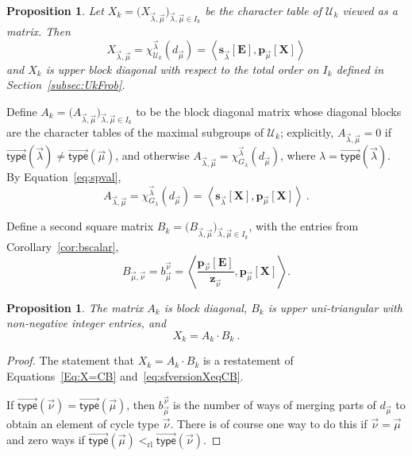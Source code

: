 \documentclass[10pt]{amsart}
\newtheorem{prop}[theorem]{Proposition}
\theoremstyle{definition}
\theoremstyle{remark}
\newcommand{\vtype}{\overrightarrow{\mathsf{type}}}
\newcommand{\XXX}{\mathbf{X}}
\newcommand{\EEE}{\mathbf{E}}
\begin{document}
\begin{prop} \label{prop:matrixX}
Let $X_k = \big( X_{ \vec{\lambda}, \vec{\mu}} \big)_{\vec{\lambda}, \vec{\mu}\in I_k}$
be the character table of $\mathcal{U}_k$ viewed as a matrix. Then
\[
X_{ \vec{\lambda}, \vec{\mu}} =
\chi^{\vec{\lambda}}_{\mathcal{U}_k}(d_{\vec{\mu}})
= \left< \mathbf{s}_{\vec{\lambda}}[\EEE], \mathbf{p}_{\vec{\mu}}[\XXX] \right>
\]
and $X_k$ is upper block diagonal with respect to the total order on $I_k$
defined in Section~\ref{subsec:UkFrob}.
\end{prop}

Define $A_k= \big( A_{ \vec{\lambda}, \vec{\mu}} \big)_{\vec{\lambda}, \vec{\mu}\in I_k}$
to be the block diagonal matrix whose diagonal blocks are the character
tables of the maximal subgroups of $\mathcal{U}_k$;
explicitly,
$A_{\vec{\lambda}, \vec{\mu}} = 0$ if $\vtype(\vec{\lambda}) \neq \vtype(\vec{\mu})$,
and otherwise
$A_{\vec{\lambda}, \vec{\mu}} = \chi^{\vec{\lambda}}_{G_\lambda}(d_{\vec{\mu}})$,
where $\lambda = \vtype(\vec{\lambda})$.
By Equation~\eqref{eq:spval},
\[
A_{\vec{\lambda}, \vec{\mu}} = \chi^{\vec{\lambda}}_{G_\lambda}( d_{\vec{\mu}} )
= \left< \mathbf{s}_{\vec{\lambda}}[\XXX], \mathbf{p}_{\vec{\mu}}[\XXX] \right>~.
\]

Define a second square matrix $B_k  = \big( B_{ \vec{\lambda}, \vec{\mu}} \big)_{\vec{\lambda}, \vec{\mu}\in I_k}$, with the entries from Corollary~\ref{cor:bscalar},
\[
B_{\vec{\mu},\vec{\nu}} = b_{\vec{\mu}}^{\vec{\nu}} =
\left< \frac{\mathbf{p}_{\vec{\nu}}[\EEE]}{\mathbf{z}_{\vec{\nu}}},
\mathbf{p}_{\vec{\mu}}[\XXX]\right>.
\]

\begin{prop}\label{prop:matrixAB}
The matrix $A_k$ is block diagonal,
$B_k$ is upper uni-triangular
with non-negative integer entries, and
\[
X_k = A_k \cdot B_k~.
\]
\end{prop}
\begin{proof}
The statement that
$X_k = A_k \cdot B_k$ is a restatement of Equations~\eqref{Eq:X=CB} and~\eqref{eq:sfversionXeqCB}.

If $\vtype(\vec{\nu}) = \vtype(\vec{\mu})$, then
$b_{\vec{\mu}}^{\vec{\nu}}$ is the number of ways
of merging parts of $d_{\vec{\mu}}$ to obtain an element
of cycle type $\vec{\nu}$.  There is of course one way to do this
if $\vec{\nu} = \vec{\mu}$ and zero ways
if $\vtype(\vec{\mu}) <_{\mathrm{rl}} \vtype(\vec{\nu})$.
\end{proof}
\end{document}
